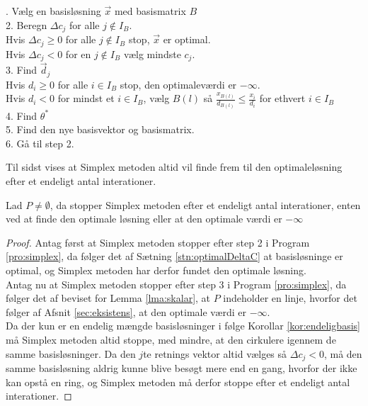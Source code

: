 \begin{pro}
. Vælg en basisløsning $\vec{x}$ med basismatrix $B$
\\ 2. Beregn $\Delta c_j$ for alle $j \notin I_B$. 
\\  		\qquad Hvis $\Delta c_j\geq 0$ for alle $j \notin I_B$ stop, $\vec{x}$ er optimal.
\\		\qquad  Hvis $\Delta c_j < 0$ for en $j \notin I_B$ vælg mindste $c_j$.
\\ 3. Find $\vec{d}_j$
\\		\qquad  Hvis $d_i \geq 0 $ for alle $i \in I_B$ stop, den optimaleværdi er $- \infty$.
\\		\qquad  Hvis $d_i < 0 $ for mindst et $i \in I_B$, vælg $B(l)$ så $\frac{x_{B(l)}}{d_{B(l)}}\leq \frac{x_i}{d_i} $ for ethvert $i \in I_B$
\\ 4. Find $\theta^*$
\\ 5. Find den nye basisvektor og basismatrix.
\\ 6. Gå til step 2.
\label{pro:simplex}
\end{pro}
Til sidst vises at Simplex metoden altid vil finde frem til den optimaleløsning efter et endeligt antal interationer.
\begin{stn}
Lad $P \neq \emptyset$, da stopper Simplex metoden efter et endeligt antal interationer, enten ved at finde den optimale løsning eller at den optimale værdi er $- \infty$
\end{stn}
\begin{proof}
Antag først at Simplex metoden stopper efter step 2 i Program \ref{pro:simplex}, da følger det af Sætning \ref{stn:optimalDeltaC}
at basisløsninge er optimal, og Simplex metoden har derfor fundet den optimale løsning.
\\ Antag nu at Simplex metoden stopper efter step 3 i Program \ref{pro:simplex}, da følger det af beviset for Lemma \ref{lma:skalar}, at $P$ indeholder en linje, hvorfor det følger af Afsnit \ref{sec:eksistens},
at den optimale værdi er $-\infty$.
\\ Da der kun er en endelig mængde basisløsninger i følge Korollar \ref{kor:endeligbasis}
må Simplex metoden altid stoppe, med mindre, at den cirkulere igennem de samme basisløsninger.
Da den $j$te retnings vektor altid vælges så $\Delta c_j < 0$, må den samme basisløsning aldrig kunne blive besøgt mere end en gang, hvorfor der ikke kan opstå en ring, og Simplex metoden må derfor stoppe efter et endeligt antal interationer.
\end{proof} 





